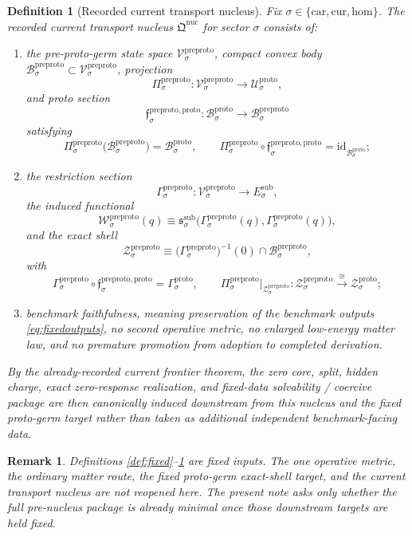 \documentclass[11pt]{article}
\newcommand{\Car}{\mathrm{car}}
\newcommand{\Cur}{\mathrm{cur}}
\newcommand{\Hom}{\mathrm{hom}}
\newcommand{\SubTarget}[1]{E_{#1}^{\mathrm{sub}}}
\newcommand{\SubPair}[1]{\mathfrak s_{#1}^{\mathrm{sub}}}
\newcommand{\ProtoSpace}[1]{\mathcal U_{#1}^{\mathrm{proto}}}
\newcommand{\ProtoBody}[1]{\mathcal B_{#1}^{\mathrm{proto}}}
\newcommand{\ProtoSection}[1]{\Gamma_{#1}^{\mathrm{proto}}}
\newcommand{\ProtoShellSet}[1]{\mathcal Z_{#1}^{\mathrm{proto}}}
\newcommand{\PreProtoNucleus}{\mathfrak Q^{\mathrm{nuc}}}
\newcommand{\PreProtoSpace}[1]{\mathcal V_{#1}^{\mathrm{preproto}}}
\newcommand{\PreProtoBody}[1]{\mathcal B_{#1}^{\mathrm{preproto}}}
\newcommand{\PreProtoProj}[1]{\Pi_{#1}^{\mathrm{preproto}}}
\newcommand{\PreProtoProtoMin}[1]{\mathfrak f_{#1}^{\mathrm{preproto,proto}}}
\newcommand{\PreProtoSection}[1]{\Gamma_{#1}^{\mathrm{preproto}}}
\newcommand{\PreProtoFunctional}[1]{\mathscr W_{#1}^{\mathrm{preproto}}}
\newcommand{\PreProtoShellSet}[1]{\mathcal Z_{#1}^{\mathrm{preproto}}}
\newtheorem{definition}{Definition}
\newtheorem{remark}{Remark}
\begin{document}
\begin{definition}[Recorded current transport nucleus]
\label{def:nucleus}
Fix \(\sigma\in\{\Car,\Cur,\Hom\}\). The recorded current transport nucleus \(\PreProtoNucleus\) for sector \(\sigma\) consists of:
\begin{enumerate}
    \item the pre-proto-germ state space \(\PreProtoSpace{\sigma}\), compact convex body \(\PreProtoBody{\sigma}\subset\PreProtoSpace{\sigma}\), projection
    \[
    \PreProtoProj{\sigma}:\PreProtoSpace{\sigma}\to\ProtoSpace{\sigma},
    \]
    and proto section
    \[
    \PreProtoProtoMin{\sigma}:\ProtoBody{\sigma}\to\PreProtoBody{\sigma}
    \]
    satisfying
    \[
    \PreProtoProj{\sigma}\bigl(\PreProtoBody{\sigma}\bigr)=\ProtoBody{\sigma},
    \qquad
    \PreProtoProj{\sigma}\circ\PreProtoProtoMin{\sigma}
    =
    \mathrm{id}_{\ProtoBody{\sigma}};
    \]
    \item the restriction section
    \[
    \PreProtoSection{\sigma}:\PreProtoSpace{\sigma}\to\SubTarget{\sigma},
    \]
    the induced functional
    \[
    \PreProtoFunctional{\sigma}(q)
    \equiv
    \SubPair{\sigma}\bigl(\PreProtoSection{\sigma}(q),\PreProtoSection{\sigma}(q)\bigr),
    \]
    and the exact shell
    \[
    \PreProtoShellSet{\sigma}
    \equiv
    \bigl(\PreProtoSection{\sigma}\bigr)^{-1}(0)\cap\PreProtoBody{\sigma},
    \]
    with
    \[
    \PreProtoSection{\sigma}\circ\PreProtoProtoMin{\sigma}
    =
    \ProtoSection{\sigma},
    \qquad
    \PreProtoProj{\sigma}\big|_{\PreProtoShellSet{\sigma}}
    :
    \PreProtoShellSet{\sigma}
    \xrightarrow{\cong}
    \ProtoShellSet{\sigma};
    \]
    \item benchmark faithfulness, meaning preservation of the benchmark outputs \eqref{eq:fixedoutputs}, no second operative metric, no enlarged low-energy matter law, and no premature promotion from adoption to completed derivation.
\end{enumerate}
By the already-recorded current frontier theorem, the zero core, split, hidden charge, exact zero-response realization, and fixed-data solvability / coercive package are then canonically induced downstream from this nucleus and the fixed proto-germ target rather than taken as additional independent benchmark-facing data.
\end{definition}

\begin{remark}
Definitions \ref{def:fixed}--\ref{def:nucleus} are fixed inputs. The one operative metric, the ordinary matter route, the fixed proto-germ exact-shell target, and the current transport nucleus are not reopened here. The present note asks only whether the full pre-nucleus package is already minimal once those downstream targets are held fixed.
\end{remark}
\end{document}
